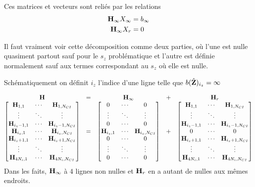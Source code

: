 Ces matrices et vecteurs sont reliés par les relations
\begin{align}
  {\mathbf{H}}_\infty X_\infty &= {b}_\infty
  \\
  {\mathbf{H}}_\infty X_r &= 0
\end{align}

Il faut vraiment voir cette décomposition comme deux parties, où l'une est nulle quasiment partout sauf pour le \(s_z\) problématique et l'autre est définie normalement sauf aux termes correspondant au \(s_z\) où elle est nulle.

Schématiquement on définit \(i_z\) l'indice d'une ligne telle que \({b}(\hat{\mathbf{Z}})_{i_z} = \infty\)

\begin{equation*}
  \begin{matrix}
    {\mathbf{H}} &=& {\mathbf{H}}_\infty &+& {\mathbf{H}}_r
    \\
    \begin{bmatrix}
      {\mathbf{H}}_{1,1} & \cdots & {\mathbf{H}}_{1,N_{CI}}
      \\
      \vdots & \ddots & \vdots
      \\
      {\mathbf{H}}_{i_z-1,1} & \cdots & {\mathbf{H}}_{i_z-1,N_{CI}}
      \\
      {\mathbf{H}}_{i_z,1} & \cdots & {\mathbf{H}}_{i_z,N_{CI}}
      \\
      {\mathbf{H}}_{i_z+1,1} & \cdots & {\mathbf{H}}_{i_z+1,N_{CI}}
      \\
      \vdots & \ddots & \vdots
      \\
      {\mathbf{H}}_{4N_i,1} & \cdots & {\mathbf{H}}_{4N_i,N_{CI}}
    \end{bmatrix}
    & = &
    \begin{bmatrix}
      0 & \cdots & 0
      \\
      \vdots & \ddots & \vdots
      \\
      0 & \cdots & 0
      \\
      {\mathbf{H}}_{i_z,1} & \cdots & {\mathbf{H}}_{i_z,N_{CI}}
      \\
      0 & \cdots & 0
      \\
      \vdots & \ddots & \vdots
      \\
      0 & \cdots & 0
    \end{bmatrix}
    & + & 
    \begin{bmatrix}
      {\mathbf{H}}_{1,1} & \cdots & {\mathbf{H}}_{1,N_{CI}}
      \\
      \vdots & \ddots & \vdots
      \\
      {\mathbf{H}}_{i_z-1,1} & \cdots & {\mathbf{H}}_{i_z-1,N_{CI}}
      \\
      0 & \cdots & 0
      \\
      {\mathbf{H}}_{i_z+1,1} & \cdots & {\mathbf{H}}_{i_z+1,N_{CI}}
      \\
      \vdots & \ddots & \vdots
      \\
      {\mathbf{H}}_{4N_i,1} & \cdots & {\mathbf{H}}_{4N_i,N_{CI}}
    \end{bmatrix}
  \end{matrix}
\end{equation*}
Dans les faits, \({\mathbf{H}}_\infty\) à \(4\) lignes non nulles et \({\mathbf{H}}_r\) en a autant de nulles aux mêmes endroits.


